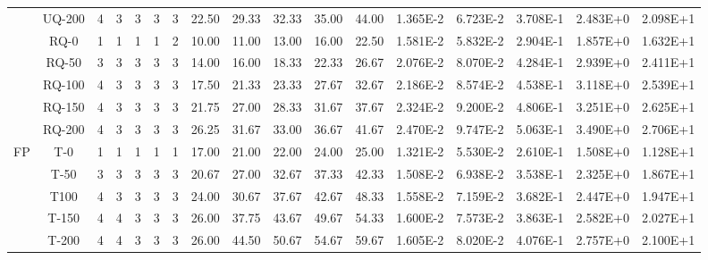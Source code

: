 \begin{table}[ht]
\begin{center}
{\begin{tabular}{cc|c|c|c|c|c|c|c|c|c|c|c|c|c|c|c|}
\multicolumn{1}{|c|}{}                      & \multicolumn{1}{|c|}{UQ-200} &	4	&	3	&	3	&	3	&	3	&	22.50	&	29.33	&	32.33	&	35.00	&	44.00	&	1.365E-2	&	6.723E-2	&	3.708E-1	&	2.483E+0	&	2.098E+1	\\
\cline{2-17}																														
\multicolumn{1}{|c|}{}                      & \multicolumn{1}{|c|}{RQ-0} &	1	&	1	&	1	&	1	&	2	&	10.00	&	11.00	&	13.00	&	16.00	&	22.50	&	1.581E-2	&	5.832E-2	&	2.904E-1	&	1.857E+0	&	1.632E+1	\\
\multicolumn{1}{|c|}{}                      & \multicolumn{1}{|c|}{RQ-50} & 	3	&	3	&	3	&	3	&	3	&	14.00	&	16.00	&	18.33	&	22.33	&	26.67	&	2.076E-2	&	8.070E-2	&	4.284E-1	&	2.939E+0	&	2.411E+1	\\
\multicolumn{1}{|c|}{}                      & \multicolumn{1}{|c|}{RQ-100} &	4	&	3	&	3	&	3	&	3	&	17.50	&	21.33	&	23.33	&	27.67	&	32.67	&	2.186E-2	&	8.574E-2	&	4.538E-1	&	3.118E+0	&	2.539E+1	\\
\multicolumn{1}{|c|}{}                      & \multicolumn{1}{|c|}{RQ-150} &	4	&	3	&	3	&	3	&	3	&	21.75	&	27.00	&	28.33	&	31.67	&	37.67	&	2.324E-2	&	9.200E-2	&	4.806E-1	&	3.251E+0	&	2.625E+1	\\
\multicolumn{1}{|c|}{}                      & \multicolumn{1}{|c|}{RQ-200} & 	4	&	3	&	3	&	3	&	3	&	26.25	&	31.67	&	33.00	&	36.67	&	41.67	&	2.470E-2	&	9.747E-2	&	5.063E-1	&	3.490E+0	&	2.706E+1	\\
\cline{1-17}																														
\multicolumn{1}{|c|}{\multirow{15}{*}{FP}} & \multicolumn{1}{|c|}{T-0} & 	1	&	1	&	1	&	1	&	1	&	17.00	&	21.00	&	22.00	&	24.00	&	25.00	&	1.321E-2	&	5.530E-2	&	2.610E-1	&	1.508E+0	&	1.128E+1	\\
\multicolumn{1}{|c|}{}                      & \multicolumn{1}{|c|}{T-50} & 	3	&	3	&	3	&	3	&	3	&	20.67	&	27.00	&	32.67	&	37.33	&	42.33	&	1.508E-2	&	6.938E-2	&	3.538E-1	&	2.325E+0	&	1.867E+1	\\
\multicolumn{1}{|c|}{}                      & \multicolumn{1}{|c|}{T100} &	4	&	3	&	3	&	3	&	3	&	24.00	&	30.67	&	37.67	&	42.67	&	48.33	&	1.558E-2	&	7.159E-2	&	3.682E-1	&	2.447E+0	&	1.947E+1	\\
\multicolumn{1}{|c|}{}                      & \multicolumn{1}{|c|}{T-150} &	4	&	4	&	3	&	3	&	3	&	26.00	&	37.75	&	43.67	&	49.67	&	54.33	&	1.600E-2	&	7.573E-2	&	3.863E-1	&	2.582E+0	&	2.027E+1	\\
\multicolumn{1}{|c|}{}                      & \multicolumn{1}{|c|}{T-200} &	4	&	4	&	3	&	3	&	3	&	26.00	&	44.50	&	50.67	&	54.67	&	59.67	&	1.605E-2	&	8.020E-2	&	4.076E-1	&	2.757E+0	&	2.100E+1	\\

\end{tabular}}
\end{center}
\end{table}
